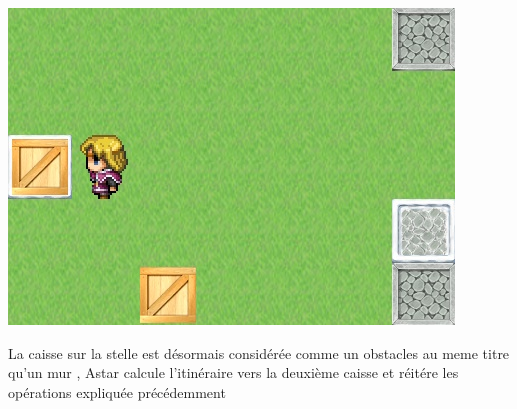 \documentclass{article}
\begin{document}
		\begin{center}
		\vspace{1cm}
		\includegraphics[scale=0.8]{../Screenshots/astar5.jpg}
		
		La caisse sur la stelle est désormais considérée comme un obstacles au meme titre qu'un mur , Astar calcule l'itinéraire vers la deuxième caisse et réitére les opérations expliquée précédemment
		\end{center}
		
\end{document}
